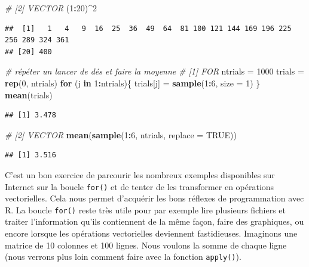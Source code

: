 \documentclass[
]{book}
\newenvironment{Shaded}{\begin{snugshade}}{\end{snugshade}}
\newcommand{\CommentTok}[1]{\textcolor[rgb]{0.56,0.35,0.01}{\textit{#1}}}
\newcommand{\ControlFlowTok}[1]{\textcolor[rgb]{0.13,0.29,0.53}{\textbf{#1}}}
\newcommand{\DataTypeTok}[1]{\textcolor[rgb]{0.13,0.29,0.53}{#1}}
\newcommand{\DecValTok}[1]{\textcolor[rgb]{0.00,0.00,0.81}{#1}}
\newcommand{\KeywordTok}[1]{\textcolor[rgb]{0.13,0.29,0.53}{\textbf{#1}}}
\newcommand{\NormalTok}[1]{#1}
\newcommand{\OperatorTok}[1]{\textcolor[rgb]{0.81,0.36,0.00}{\textbf{#1}}}
\newcommand{\OtherTok}[1]{\textcolor[rgb]{0.56,0.35,0.01}{#1}}
\newcommand{\StringTok}[1]{\textcolor[rgb]{0.31,0.60,0.02}{#1}}
\begin{document}
\begin{Shaded}
\begin{Highlighting}[]
\CommentTok{# [2] VECTOR}
\NormalTok{(}\DecValTok{1}\OperatorTok{:}\DecValTok{20}\NormalTok{)}\OperatorTok{^}\DecValTok{2}
\end{Highlighting}
\end{Shaded}

\begin{verbatim}
##  [1]   1   4   9  16  25  36  49  64  81 100 121 144 169 196 225 256 289 324 361
## [20] 400
\end{verbatim}

\begin{Shaded}
\begin{Highlighting}[]
\CommentTok{# répéter un lancer de dés et faire la moyenne}
\CommentTok{# [1] FOR}
\NormalTok{ntrials =}\StringTok{ }\DecValTok{1000}
\NormalTok{trials =}\StringTok{ }\KeywordTok{rep}\NormalTok{(}\DecValTok{0}\NormalTok{, ntrials)}
\ControlFlowTok{for}\NormalTok{ (j }\ControlFlowTok{in} \DecValTok{1}\OperatorTok{:}\NormalTok{ntrials)\{}
\NormalTok{  trials[j] =}\StringTok{ }\KeywordTok{sample}\NormalTok{(}\DecValTok{1}\OperatorTok{:}\DecValTok{6}\NormalTok{, }\DataTypeTok{size =} \DecValTok{1}\NormalTok{)}
\NormalTok{\}}
\KeywordTok{mean}\NormalTok{(trials)}
\end{Highlighting}
\end{Shaded}

\begin{verbatim}
## [1] 3.478
\end{verbatim}

\begin{Shaded}
\begin{Highlighting}[]
\CommentTok{# [2] VECTOR}
\KeywordTok{mean}\NormalTok{(}\KeywordTok{sample}\NormalTok{(}\DecValTok{1}\OperatorTok{:}\DecValTok{6}\NormalTok{, ntrials, }\DataTypeTok{replace =} \OtherTok{TRUE}\NormalTok{))}
\end{Highlighting}
\end{Shaded}

\begin{verbatim}
## [1] 3.516
\end{verbatim}

C'est un bon exercice de parcourir les nombreux exemples disponibles sur Internet sur la boucle \texttt{for()} et de tenter de les transformer en opérations vectorielles. Cela nous permet d'acquérir les bons réflexes de programmation avec R. La boucle \texttt{for()} reste très utile pour par exemple lire plusieurs fichiers et traiter l'information qu'ils contiennent de la même façon, faire des graphiques, ou encore lorsque les opérations vectorielles deviennent fastidieuses. Imaginons une matrice de 10 colonnes et 100 lignes. Nous voulons la somme de chaque ligne (nous verrons plus loin comment faire avec la fonction \texttt{apply()}).
\end{document}
